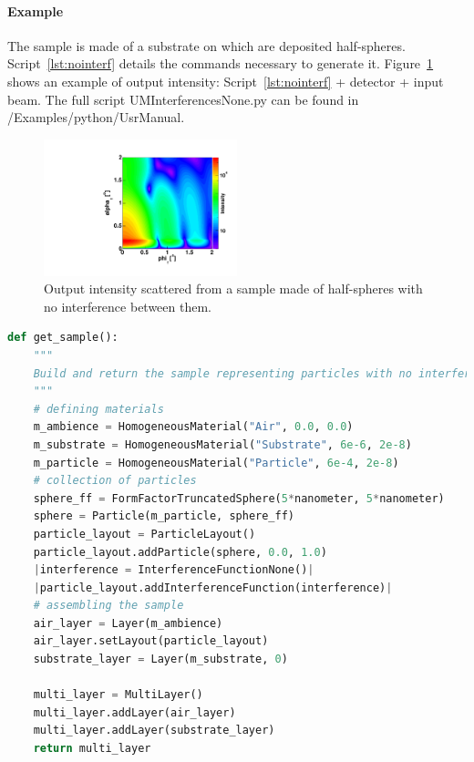 \paragraph{Example} The sample is made of a substrate on which are deposited half-spheres. Script~\ref{lst:nointerf} details the commands necessary to generate it. Figure~\ref{fig:nointerf} shows an example of output intensity: Script~\ref{lst:nointerf}  + detector + input beam. The full script UMInterferencesNone.py can be found in /Examples/python/UsrManual. 


\begin{figure}[h]
\begin{center}
\includegraphics[width=0.5\textwidth]{Figures/HSphere_NoInterf}
\end{center}
\caption{Output intensity scattered from a sample made of half-spheres with no interference between them.}
\label{fig:nointerf}
\end{figure}

\FloatBarrier
\newpage

\begin{lstlisting}[language=python, style=eclipseboxed,numbers=none,nolol,caption={\Code{Python} script to simulate a sample made of half-spheres deposited on a substrate layer without any interference. The part specific to the interferences is marked in red italic font.},label={lst:nointerf}]
def get_sample():
    """
    Build and return the sample representing particles with no interference
    """
    # defining materials
    m_ambience = HomogeneousMaterial("Air", 0.0, 0.0)
    m_substrate = HomogeneousMaterial("Substrate", 6e-6, 2e-8)
    m_particle = HomogeneousMaterial("Particle", 6e-4, 2e-8)
    # collection of particles
    sphere_ff = FormFactorTruncatedSphere(5*nanometer, 5*nanometer)
    sphere = Particle(m_particle, sphere_ff)
    particle_layout = ParticleLayout()
    particle_layout.addParticle(sphere, 0.0, 1.0)
    |interference = InterferenceFunctionNone()| 
    |particle_layout.addInterferenceFunction(interference)|
    # assembling the sample
    air_layer = Layer(m_ambience)
    air_layer.setLayout(particle_layout)
    substrate_layer = Layer(m_substrate, 0)

    multi_layer = MultiLayer()
    multi_layer.addLayer(air_layer)
    multi_layer.addLayer(substrate_layer)
    return multi_layer
\end{lstlisting}

